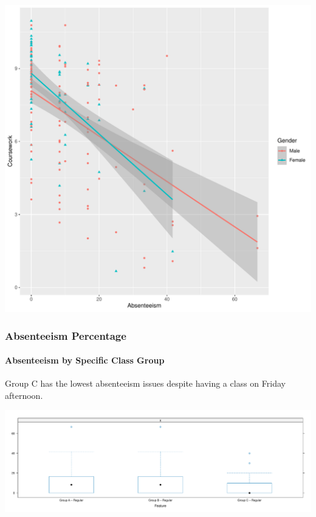 \documentclass[
]{article}
\begin{document}
\includegraphics{Mid-SemesterCourseEvaluation-20240819-20241125-ADB-BBIT2.2_files/figure-latex/DrillDownCorr1-1.pdf}

\newpage

\subsubsection{Absenteeism Percentage}\label{absenteeism-percentage}

\paragraph{Absenteeism by Specific Class
Group}\label{absenteeism-by-specific-class-group}

Group C has the lowest absenteeism issues despite having a class on
Friday afternoon.

\includegraphics{Mid-SemesterCourseEvaluation-20240819-20241125-ADB-BBIT2.2_files/figure-latex/AbsenteeismBoxandWhiskerSpecificGroup-1.pdf}
\end{document}
